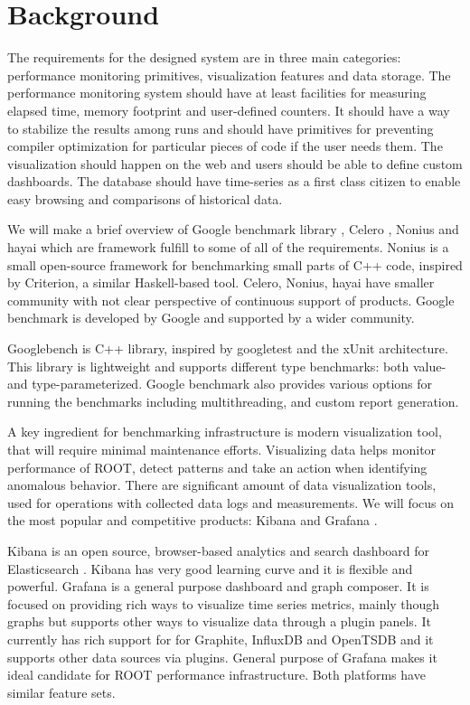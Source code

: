 \documentclass{webofc}
\begin{document}
\section{Background}

The requirements for the designed system are in three main categories: performance monitoring primitives, visualization features and data storage. The performance monitoring system should have at least facilities for measuring elapsed time, memory footprint and user-defined counters. It should have a way to stabilize the results among runs and should have primitives for preventing compiler optimization for particular pieces of code if the user needs them. The visualization should happen on the web and users should be able to define custom dashboards. The database should have time-series as a first class citizen to enable easy browsing and comparisons of historical data.

We will make a brief overview of Google benchmark library \cite{gbench}, Celero \cite{celero}, Nonius \cite{nonius} and hayai \cite{hayai} which are framework fulfill to some of all of the requirements. Nonius is a small open-source framework for benchmarking small parts of C++ code, inspired by Criterion, a similar Haskell-based tool. Celero, Nonius, hayai have smaller community with not clear perspective of continuous support of products. Google benchmark is developed by Google and supported by a wider community.

Googlebench \cite{gbench} is C++ library, inspired by googletest and the xUnit architecture.  This library is lightweight and supports different type benchmarks: both value- and type-parameterized. Google benchmark also provides various options for running the benchmarks including multithreading, and custom report generation.


A key ingredient for benchmarking infrastructure is modern visualization tool, that will require minimal maintenance efforts. Visualizing data helps monitor performance of ROOT, detect patterns and take an action when identifying anomalous behavior. There are significant amount of data visualization tools, used for operations with collected data logs and measurements. We will focus on the most popular and competitive products: Kibana \cite{kibana} and Grafana \cite{grafana}.

Kibana is an open source, browser-based analytics and search dashboard for Elasticsearch \cite{elasticsearch}. Kibana has very good learning curve and it is flexible and powerful. Grafana is a general purpose dashboard and graph composer. It is focused on providing rich ways to visualize time series metrics, mainly though graphs but supports other ways to visualize data through a plugin panels. It currently has rich support for for Graphite, InfluxDB and OpenTSDB and it supports other data sources via plugins. General purpose of Grafana makes it ideal candidate for ROOT performance infrastructure. Both platforms have similar feature sets.
\end{document}
